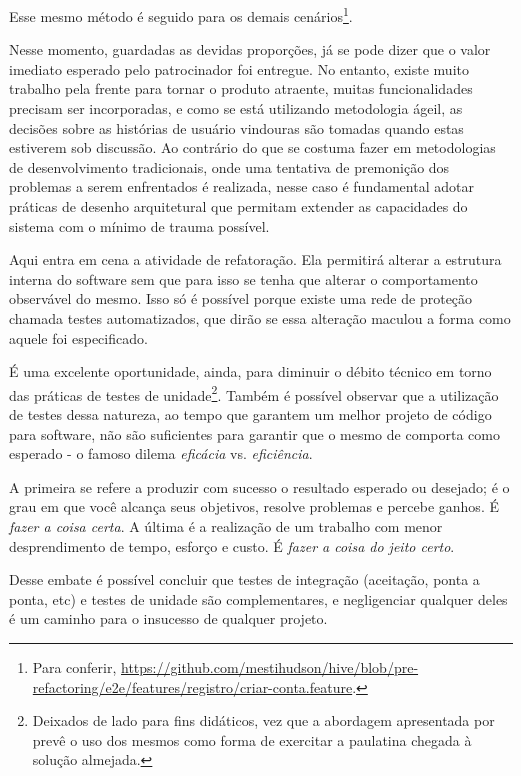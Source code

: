  Esse mesmo método é seguido para os demais cenários\footnote{Para conferir, \url{https://github.com/mestihudson/hive/blob/pre-refactoring/e2e/features/registro/criar-conta.feature}.}.

  Nesse momento, guardadas as devidas proporções, já se pode dizer que o valor imediato esperado pelo patrocinador foi entregue. No entanto, existe muito trabalho pela frente para tornar o produto atraente, muitas funcionalidades precisam ser incorporadas, e como se está utilizando metodologia ágeil, as decisões sobre as histórias de usuário vindouras são tomadas quando estas estiverem sob discussão. Ao contrário do que se costuma fazer em metodologias de desenvolvimento tradicionais, onde uma tentativa de premonição dos problemas a serem enfrentados é realizada, nesse caso é fundamental adotar práticas de desenho arquitetural que permitam extender as capacidades do sistema com o mínimo de trauma possível.

  Aqui entra em cena a atividade de refatoração. Ela permitirá alterar a estrutura interna do software sem que para isso se tenha que alterar o comportamento observável do mesmo. Isso só é possível porque existe uma rede de proteção chamada testes automatizados, que dirão se essa alteração maculou a forma como aquele foi especificado.

  É uma excelente oportunidade, ainda, para diminuir o débito técnico em torno das práticas de testes de unidade\footnote{Deixados de lado para fins didáticos, vez que a abordagem apresentada por  prevê o uso dos mesmos como forma de exercitar a paulatina chegada à solução almejada.}. Também é possível observar que a utilização de testes dessa natureza, ao tempo que garantem um melhor projeto de código para software, não são suficientes para garantir que o mesmo de comporta como esperado - o famoso dilema \emph{eficácia} vs. \emph{eficiência}.

  A primeira se refere a produzir com sucesso o resultado esperado ou desejado; é o grau em que você alcança seus objetivos, resolve problemas e percebe ganhos. É \emph{fazer a coisa certa}.
      A última é a realização de um trabalho com menor desprendimento de tempo, esforço e custo. É \emph{fazer a coisa do jeito certo}.\cite[p.2, tradução nossa]{Stack2016}

  Desse embate é possível concluir que testes de integração (aceitação, ponta a ponta, etc) e testes de unidade são complementares, e negligenciar qualquer deles é um caminho para o insucesso de qualquer projeto.


